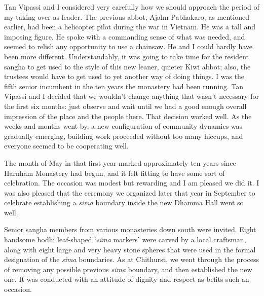 
\enlargethispage{2\baselineskip}

Tan Vipassi and I considered very carefully how we should approach the
period of my taking over as leader. The previous abbot, Ajahn Pabhakaro,
as mentioned earlier, had been a helicopter pilot during the war in
Vietnam. He was a tall and imposing figure. He spoke with a commanding
sense of what was needed, and seemed to relish any opportunity to use a
chainsaw. He and I could hardly have been more different.
Understandably, it was going to take time for the resident sangha to get
used to the style of this new leaner, quieter Kiwi abbot; also, the
trustees would have to get used to yet another way of doing things. I
was the fifth senior incumbent in the ten years the monastery had been
running. Tan Vipassi and I decided that we wouldn't change anything that
wasn't necessary for the first six months: just observe and wait until
we had a good enough overall impression of the place and the people there.
That decision worked well. As the weeks and months went by, a new
configuration of community dynamics was gradually emerging, building work
proceeded without too many hiccups, and everyone seemed to be
cooperating well.

The month of May in that first year marked approximately ten years since
Harnham Monastery had begun, and it felt fitting to have some sort of
celebration. The occasion was modest but rewarding and I am pleased we
did it. I was also pleased that the ceremony we organized later that
year in September to celebrate establishing a \emph{sima} boundary
inside the new Dhamma Hall went so well.

Senior sangha members from various monasteries down south were invited.
Eight handsome bodhi leaf-shaped `\emph{sima} markers' were carved by a
local craftsman, along with eight large and very heavy stone spheres
that were used in the formal designation of the \emph{sima} boundaries.
As at Chithurst, we went through the process of removing any possible
previous \emph{sima} boundary, and then established the new one. It was
conducted with an attitude of dignity and respect as befits such an
occasion.

\enlargethispage{\baselineskip}

